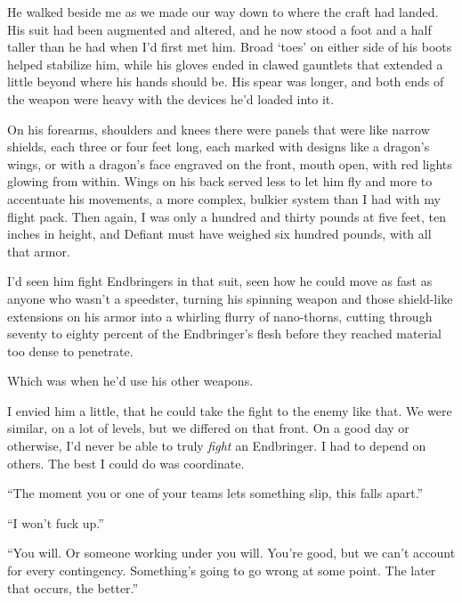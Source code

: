 He walked beside me as we made our way down to where the craft had landed. His suit had been augmented and altered, and he now stood a foot and a half taller than he had when I'd first met him.  Broad `toes' on either side of his boots helped stabilize him, while his gloves ended in clawed gauntlets that extended a little beyond where his hands should be.  His spear was longer, and both ends of the weapon were heavy with the devices he'd loaded into it.



On his forearms, shoulders and knees there were panels that were like narrow shields, each three or four feet long, each marked with designs like a dragon's wings, or with a dragon's face engraved on the front, mouth open, with red lights glowing from within.  Wings on his back served less to let him fly and more to accentuate his movements, a more complex, bulkier system than I had with my flight pack.  Then again, I was only a hundred and thirty pounds at five feet, ten inches in height, and Defiant must have weighed six hundred pounds, with all that armor.



I'd seen him fight Endbringers in that suit, seen how he could move as fast as anyone who wasn't a speedster, turning his spinning weapon and those shield-like extensions on his armor into a whirling flurry of nano-thorns, cutting through seventy to eighty percent of the Endbringer's flesh before they reached material too dense to penetrate.



Which was when he'd use his other weapons.



I envied him a little, that he could take the fight to the enemy like that.  We were similar, on a lot of levels, but we differed on that front.  On a good day or otherwise, I'd never be able to truly \emph{fight} an Endbringer.  I had to depend on others.  The best I could do was coordinate.



``The moment you or one of your teams lets something slip, this falls apart.''



``I won't fuck up.''



``You will.  Or someone working under you will.  You're good, but we can't account for every contingency.  Something's going to go wrong at some point.  The later that occurs, the better.''



